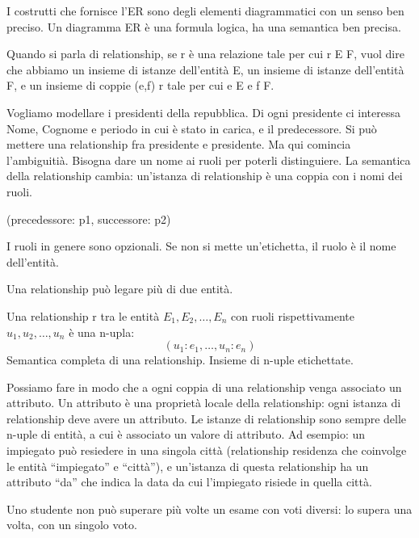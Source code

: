 I costrutti che fornisce l'ER sono degli elementi diagrammatici con un senso ben preciso. Un diagramma ER \`e una formula logica, ha una semantica ben precisa.

Quando si parla di relationship, se r \`e una relazione tale per cui r \subseteq E \times F, vuol dire che abbiamo un insieme di istanze dell'entit\`a E, un insieme di istanze dell'entit\`a F, e un insieme di coppie (e,f) \in r tale per cui e \in E e f \in F.

Vogliamo modellare i presidenti della repubblica. Di ogni presidente ci interessa Nome, Cognome e periodo in cui \`e stato in carica, e il predecessore. Si pu\`o mettere una relationship fra presidente e presidente. Ma qui comincia l'ambiguiti\`a. Bisogna dare un nome ai ruoli per poterli distinguiere. La semantica della relationship cambia: un'istanza di relationship \`e una coppia con i nomi dei ruoli.

(precedessore: p1, successore: p2)

I ruoli in genere sono opzionali. Se non si mette un'etichetta, il ruolo \`e il nome dell'entit\`a.

Una relationship pu\`o legare pi\`u di due entit\`a.

Una relationship r tra le entit\`a $E_1, E_2, \ldots, E_n$ con ruoli rispettivamente $u_1, u_2, \ldots, u_n$ \`e una n-upla:
\[
(u_1: e_1, \ldots, u_n: e_n)
\]
Semantica completa di una relationship. Insieme di n-uple etichettate.

\begin{figure}[h]
\centering
{}
\end{figure}

Possiamo fare in modo che a ogni coppia di una relationship venga associato un attributo. Un attributo \`e una propriet\`a locale della relationship: ogni istanza di relationship deve avere un attributo. Le istanze di relationship sono sempre delle n-uple di entit\`a, a cui \`e associato un valore di attributo. Ad esempio: un impiegato pu\`o resiedere in una singola citt\`a (relationship residenza che coinvolge le entit\`a ``impiegato'' e ``citt\`a''), e un'istanza di questa relationship ha un attributo ``da'' che indica la data da cui l'impiegato risiede in quella citt\`a.

Uno studente non pu\`o superare pi\`u volte un esame con voti diversi: lo supera una volta, con un singolo voto.


